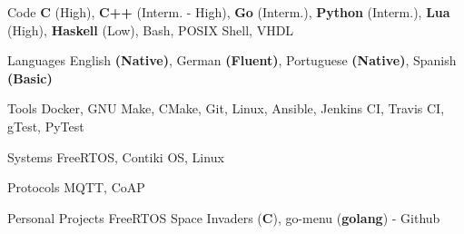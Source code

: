 
\begin{cvskills}
  \cvskill
    {Code} %
    {\textbf{C} (High),
     \textbf{C++} (Interm. - High),
     \textbf{Go} (Interm.),
     \textbf{Python} (Interm.),
     \textbf{Lua} (High),
     \textbf{Haskell} (Low),
     Bash, POSIX Shell,
     VHDL}

  \cvskill
    {Languages} %
    {English \textbf{(Native)}, German \textbf{(Fluent)}, Portuguese \textbf{(Native)}, Spanish \textbf{(Basic)}} %

  \cvskill
    {Tools} %
    {Docker, GNU Make, CMake, Git, Linux, Ansible, Jenkins CI, Travis CI, gTest, PyTest} %

  \cvskill
    {Systems} %
    {FreeRTOS, Contiki OS, Linux} %

  \cvskill
    {Protocols} %
    {MQTT, CoAP} %

  \cvskill
    {Personal Projects} %
    {FreeRTOS Space Invaders (\textbf{C}), go-menu (\textbf{golang}) - Github} %
\end{cvskills}
